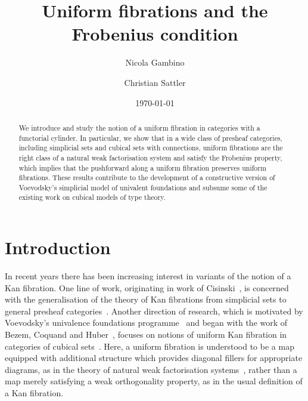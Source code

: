 \documentclass[reqno,10pt,a4paper,oneside]{amsart}
\title{Uniform fibrations and the Frobenius condition}
\begin{document}
\begin{abstract}
We introduce and study the notion of a uniform fibration in categories with a functorial cylinder. In particular,
we show that in a wide class of presheaf categories, including simplicial sets and cubical sets with connections,
uniform fibrations are the right class of a natural weak factorisation  system and satisfy the Frobenius property,
which implies that the pushforward along a uniform fibration preserves uniform fibrations. These results contribute
to the development of a constructive version of Voevodsky's simplicial model of univalent foundations and
subsume some of the existing work on cubical models of type theory.
\end{abstract}

\author{Nicola Gambino}
\address{School of Mathematics, University of Leeds, Leeds LS2 9JT, UK}

\author{Christian Sattler}
\address{School of Mathematics, University of Leeds, Leeds LS2 9JT, UK}

\date{\today}

\maketitle

\tableofcontents



\section{Introduction}

In recent years there has been increasing interest in variants of the notion of a Kan fibration.
One line of work, originating in work of Cisinski~\cite{cisinski-asterisque}, is concerned with the generalisation of the theory of Kan fibrations from simplicial sets to general presheaf categories~\cite{cisinski-univalence,moerdijk-minimal}.
Another direction of research, which is motivated by Voevodsky's univalence foundations programme~\cite{voevodsky:uf} and began with the work of Bezem, Coquand and Huber~\cite{coquand-cubical-sets}, focuses on notions of uniform Kan fibration in categories of cubical sets~\cite{awodey-cubical,coquand-variation, huber-thesis,pitts-cubical-nominal,swan-awfs}.
Here, a uniform fibration is understood to be a map equipped with additional structure which provides diagonal fillers for appropriate diagrams, as in the theory of natural weak factorisation systems~\cite{grandis-tholen-nwfs}, rather than a map merely satisfying a weak orthogonality property, as in the usual definition of a Kan fibration.
\end{document}
